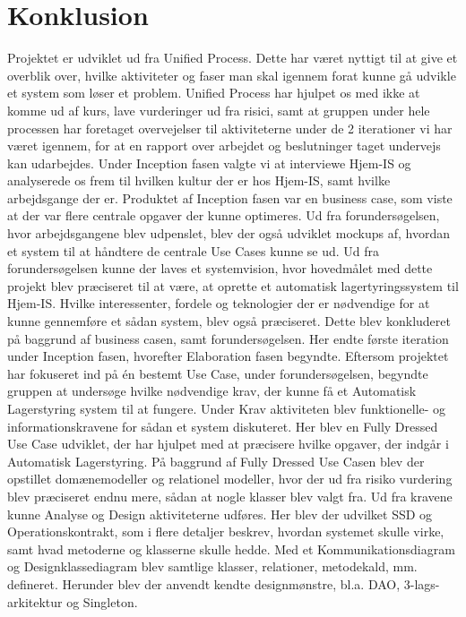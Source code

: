 \chapter{Konklusion}\label{ch:konklusion}

Projektet er udviklet ud fra Unified Process. Dette har været nyttigt til at give et overblik over, hvilke aktiviteter og faser man skal igennem forat kunne gå udvikle et system som løser et problem. Unified Process har hjulpet os med ikke at komme ud af kurs, lave vurderinger ud fra risici, samt at gruppen under hele processen har foretaget overvejelser til aktiviteterne under de 2 iterationer vi har været igennem, for at en rapport over arbejdet og beslutninger taget undervejs kan udarbejdes. 
Under Inception fasen valgte vi at interviewe Hjem-IS og analyserede os frem til hvilken kultur der er hos Hjem-IS, samt hvilke arbejdsgange der er. Produktet af Inception fasen var en business case, som viste at der var flere centrale opgaver der kunne optimeres. Ud fra forundersøgelsen, hvor arbejdsgangene blev udpenslet, blev der også udviklet mockups af, hvordan et system til at håndtere de centrale Use Cases kunne se ud.
Ud fra forundersøgelsen kunne der laves et systemvision, hvor hovedmålet med dette projekt blev præciseret til at være, at oprette et automatisk lagertyringssystem til Hjem-IS. Hvilke interessenter, fordele og teknologier der er nødvendige for at kunne gennemføre et sådan system, blev også præciseret. Dette blev konkluderet på baggrund af business casen, samt forundersøgelsen. 
Her endte første iteration under Inception fasen, hvorefter Elaboration fasen begyndte. Eftersom projektet har fokuseret ind på én bestemt Use Case, under forundersøgelsen, begyndte gruppen at undersøge hvilke nødvendige krav, der kunne få et Automatisk Lagerstyring system til at fungere. 
Under Krav aktiviteten blev funktionelle- og informationskravene for sådan et system diskuteret. Her blev en Fully Dressed Use Case udviklet, der har hjulpet med at præcisere hvilke opgaver, der indgår i Automatisk Lagerstyring. På baggrund af Fully Dressed Use Casen blev der opstillet domænemodeller og relationel modeller, hvor der ud fra risiko vurdering blev præciseret endnu mere, sådan at nogle klasser blev valgt fra.
Ud fra kravene kunne Analyse og Design aktiviteterne udføres. Her blev der udvilket SSD og Operationskontrakt, som i flere detaljer beskrev, hvordan systemet skulle virke, samt hvad metoderne og klasserne skulle hedde. Med et Kommunikationsdiagram og Designklassediagram blev samtlige klasser, relationer, metodekald, mm. defineret. Herunder blev der anvendt kendte designmønstre, bl.a. DAO, 3-lags-arkitektur og Singleton. 
